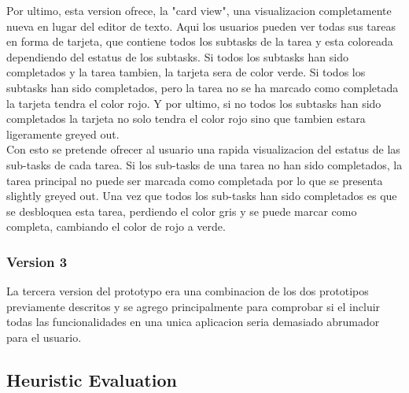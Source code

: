Por ultimo, esta version ofrece, la "card view", una visualizacion completamente nueva en lugar del editor de texto. Aqui los usuarios pueden ver todas sus tareas en forma de tarjeta, que contiene todos los subtasks de la tarea y esta coloreada dependiendo del estatus de los subtasks. Si todos los subtasks han sido completados y la tarea tambien, la tarjeta sera de color verde. Si todos los subtasks han sido completados, pero la tarea no se ha marcado como completada la tarjeta tendra el color rojo. Y por ultimo, si no todos los subtasks han sido completados la tarjeta no solo tendra el color rojo sino que tambien estara ligeramente greyed out.\\
Con esto se pretende ofrecer al usuario una rapida visualizacion del estatus de las sub-tasks de cada tarea. Si los sub-tasks de una tarea no han sido completados, la tarea principal no puede ser marcada como completada por lo que se presenta slightly greyed out. Una vez que todos los sub-tasks han sido completados es que se desbloquea esta tarea, perdiendo el color gris y se puede marcar como completa, cambiando el color de rojo a verde. 

\subsubsection{Version 3}
La tercera version del prototypo era una combinacion de los dos prototipos previamente descritos y se agrego principalmente para comprobar si el incluir todas las funcionalidades en una unica aplicacion seria demasiado abrumador para el usuario.

\subsection{Heuristic Evaluation}

